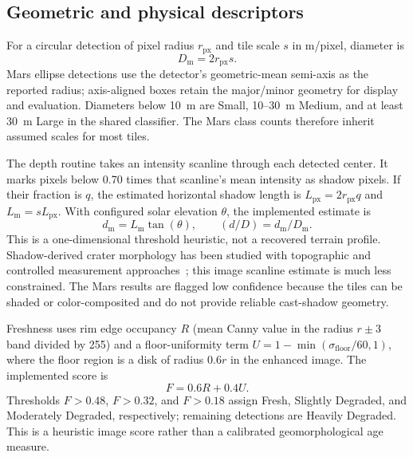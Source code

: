 \documentclass[conference]{IEEEtran}
\begin{document}
\subsection{Geometric and physical descriptors}
For a circular detection of pixel radius $r_{\mathrm{px}}$ and tile scale $s$ in m/pixel, diameter is
\begin{equation}
D_{\mathrm{m}}=2r_{\mathrm{px}}s.
\label{eq:diameter}
\end{equation}
Mars ellipse detections use the detector's geometric-mean semi-axis as the reported radius; axis-aligned boxes retain the major/minor geometry for display and evaluation. Diameters below 10~m are Small, 10--30~m Medium, and at least 30~m Large in the shared classifier. The Mars class counts therefore inherit assumed scales for most tiles.

The depth routine takes an intensity scanline through each detected center. It marks pixels below 0.70 times that scanline's mean intensity as shadow pixels. If their fraction is $q$, the estimated horizontal shadow length is $L_{\mathrm{px}}=2r_{\mathrm{px}}q$ and $L_{\mathrm{m}}=sL_{\mathrm{px}}$. With configured solar elevation $\theta$, the implemented estimate is
\begin{equation}
d_{\mathrm{m}}=L_{\mathrm{m}}\tan(\theta),\qquad (d/D)=d_{\mathrm{m}}/D_{\mathrm{m}}.
\label{eq:depth}
\end{equation}
This is a one-dimensional threshold heuristic, not a recovered terrain profile. Shadow-derived crater morphology has been studied with topographic and controlled measurement approaches~\cite{pike1984,stopar2017}; this image scanline estimate is much less constrained. The Mars results are flagged low confidence because the tiles can be shaded or color-composited and do not provide reliable cast-shadow geometry.

Freshness uses rim edge occupancy $R$ (mean Canny value in the radius $r\pm3$ band divided by 255) and a floor-uniformity term $U=1-\min(\sigma_{\mathrm{floor}}/60,1)$, where the floor region is a disk of radius $0.6r$ in the enhanced image. The implemented score is
\begin{equation}
F=0.6R+0.4U.
\label{eq:freshness}
\end{equation}
Thresholds $F>0.48$, $F>0.32$, and $F>0.18$ assign Fresh, Slightly Degraded, and Moderately Degraded, respectively; remaining detections are Heavily Degraded. This is a heuristic image score rather than a calibrated geomorphological age measure.
\end{document}
